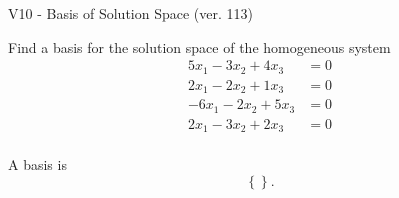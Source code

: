 \begin{exercise}
  \begin{exerciseTitle}V10 - Basis of Solution Space (ver. 113)\end{exerciseTitle}
  \begin{exerciseStatement}
    Find a basis for the solution space of the homogeneous system 
\begin{align*}
 5 x_ 1 -3 x_ 2 + 4 x_ 3 &= 0  \\ 
  2 x_ 1 -2 x_ 2 + 1 x_ 3 &= 0  \\ 
  -6 x_ 1 -2 x_ 2 + 5 x_ 3 &= 0  \\ 
  2 x_ 1 -3 x_ 2 + 2 x_ 3 &= 0  \\ 
 \end{align*}


 
  \end{exerciseStatement}

  \begin{exerciseAnswer}
   A basis is   
\[\left\{\right\}.\]

  


  \end{exerciseAnswer}
\end{exercise}